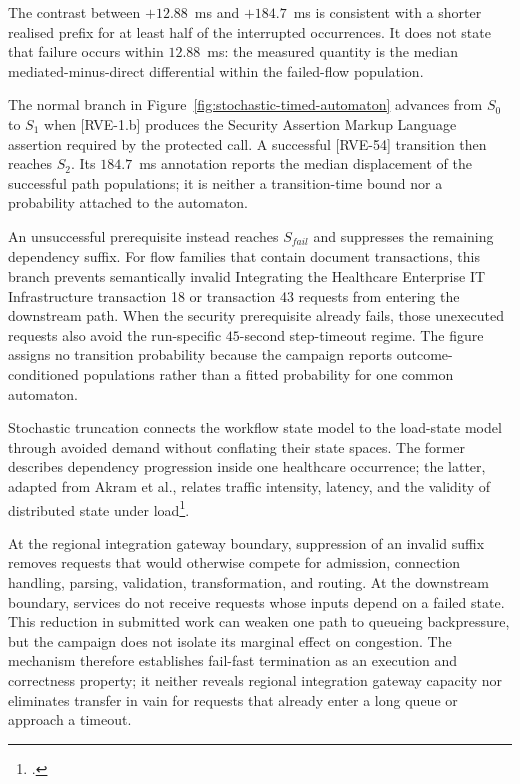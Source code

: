 \noindent The contrast between $+12.88$~ms and $+184.7$~ms is consistent with a
shorter realised prefix for at least half of the interrupted occurrences. It
does not state that failure occurs within $12.88$~ms: the measured quantity is
the median mediated-minus-direct differential within the failed-flow
population.

\noindent The normal branch in Figure~\ref{fig:stochastic-timed-automaton} advances
from $S_0$ to $S_1$ when [RVE-1.b] produces the Security Assertion Markup
Language assertion required by the protected call. A successful [RVE-54]
transition then reaches $S_2$. Its $184.7$~ms annotation reports the median
displacement of the successful path populations; it is neither a transition-time
bound nor a probability attached to the automaton.

\noindent An unsuccessful prerequisite instead reaches $S_{\mathit{fail}}$ and
suppresses the remaining dependency suffix. For flow families that contain
document transactions, this branch prevents semantically invalid Integrating
the Healthcare Enterprise IT Infrastructure transaction 18 or transaction 43
requests from entering the downstream path. When the security prerequisite
already fails, those unexecuted requests also avoid the run-specific
$45$-second step-timeout regime. The figure assigns no transition probability
because the campaign reports outcome-conditioned populations rather than a
fitted probability for one common automaton.

\noindent Stochastic truncation connects the workflow state model to the load-state
model through avoided demand without conflating their state spaces. The former
describes dependency progression inside one healthcare occurrence; the latter,
adapted from Akram et al., relates traffic intensity, latency, and the validity
of distributed state under load\footnote{%
\label{fn:akram-load-model}%
\cite{akram-numerical-latency}.}.

\noindent At the regional integration gateway boundary, suppression of an invalid suffix removes requests
that would otherwise compete for admission, connection handling, parsing,
validation, transformation, and routing. At the downstream boundary, services
do not receive requests whose inputs depend on a failed state. This reduction
in submitted work can weaken one path to queueing backpressure, but the
campaign does not isolate its marginal effect on congestion. The mechanism
therefore establishes fail-fast termination as an execution and correctness
property; it neither reveals regional integration gateway capacity nor eliminates transfer in vain
for requests that already enter a long queue or approach a timeout.

